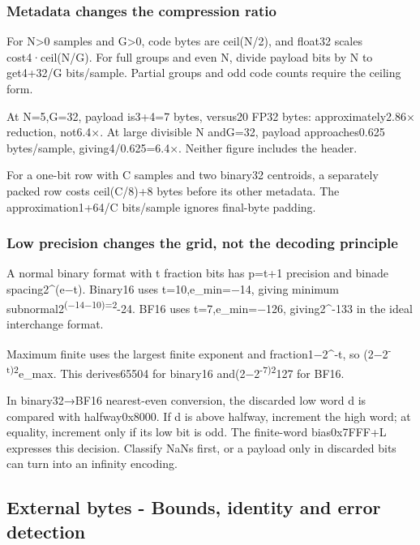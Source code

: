 \subsubsection{Metadata changes the compression ratio}\label{metadata-changes-the-compression-ratio}

For N\textgreater0 samples and G\textgreater0, code bytes are ceil(N/2), and float32 scales cost4·ceil(N/G). For full groups and even N, divide payload bits by N to get4+32/G bits/sample. Partial groups and odd code counts require the ceiling form.

At N=5,G=32, payload is3+4=7 bytes, versus20 FP32 bytes: approximately2.86× reduction, not6.4×. At large divisible N andG=32, payload approaches0.625 bytes/sample, giving4/0.625=6.4×. Neither figure includes the header.

For a one-bit row with C samples and two binary32 centroids, a separately packed row costs ceil(C/8)+8 bytes before its other metadata. The approximation1+64/C bits/sample ignores final-byte padding.

\subsubsection{Low precision changes the grid, not the decoding principle}\label{low-precision-changes-the-grid-not-the-decoding-principle}

A normal binary format with t fraction bits has p=t+1 precision and binade spacing2\^{}(e−t). Binary16 uses t=10,e\_min=−14, giving minimum subnormal2\textsuperscript{(−14−10)=2}-24. BF16 uses t=7,e\_min=−126, giving2\^{}-133 in the ideal interchange format.

Maximum finite uses the largest finite exponent and fraction1−2\^{}-t, so (2−2\textsuperscript{-t)2}e\_max. This derives65504 for binary16 and(2−2\textsuperscript{-7)2}127 for BF16.

In binary32→BF16 nearest-even conversion, the discarded low word d is compared with halfway0x8000. If d is above halfway, increment the high word; at equality, increment only if its low bit is odd. The finite-word bias0x7FFF+L expresses this decision. Classify NaNs first, or a payload only in discarded bits can turn into an infinity encoding.

\subsection{External bytes - Bounds, identity and error detection}\label{external-bytes---bounds-identity-and-error-detection}

